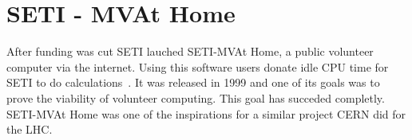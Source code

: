 \section{SETI - MVAt Home}

After funding was cut SETI lauched SETI-MVAt Home, a public volunteer computer 
via the internet. Using this software users donate idle CPU time for SETI to do 
calculations~\cite{www-hid-sp18-601-sathome-about}. It was released in 1999 and 
one of its goals was to prove the 
viability of volunteer computing. This goal has succeded completly. SETI-MVAt 
Home was one of the inspirations for a similar project CERN did for the LHC.